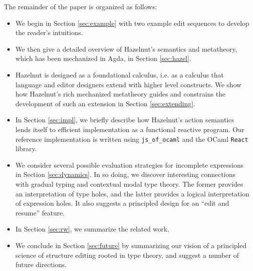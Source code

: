 The remainder of the paper is organized as follows:
\begin{itemize}[noitemsep,nolistsep]
\item We begin in Section
    \ref{sec:example} with two example edit sequences to develop the reader's intuitions.  
\item We then give a detailed overview of Hazelnut's semantics and metatheory, which has been mechanized in Agda, in Section \ref{sec:hazel}. 
\item Hazelnut is designed as a {foundational} calculus, i.e. as a calculus that language and editor designers extend with higher level constructs. We show how Hazelnut's rich mechanized metatheory guides and constrains the development of such an extension in Section \ref{sec:extending}. 
\item In Section \ref{sec:impl}, we briefly describe how Hazelnut's action semantics lends itself to efficient implementation as a functional reactive program. Our reference implementation is written using \lstinline{js_of_ocaml} and the OCaml \lstinline{React} library.
 
\item We consider several possible evaluation strategies for incomplete expressions in Section \ref{sec:dynamics}. In so doing, we discover interesting connections with gradual typing and contextual modal type theory. The former provides an interpretation of type holes, and the latter provides a logical interpretation of expression holes. It also suggests a principled design for an ``edit and resume'' feature. 

\item In Section \ref{sec:rw}, we summarize the related work.
\item We conclude in Section \ref{sec:future} by summarizing our vision of a principled science of structure editing rooted in type theory, and suggest a number of future directions.
\end{itemize} 
